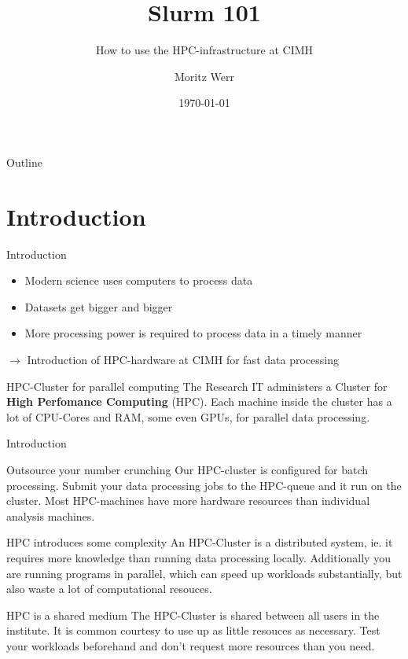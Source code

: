 \documentclass{beamer}
\title{Slurm 101}
\subtitle{How to use the HPC-infrastructure at CIMH}
\author{Moritz Werr}
\institute{Research IT}
\date{\today}
\begin{document}
\begin{frame}
    \titlepage
\end{frame}

\begin{frame}{Outline}
    \tableofcontents
\end{frame}

\section{Introduction}
\begin{frame}{Introduction}
	\begin{itemize}
		\item Modern science uses computers to process data
		\item Datasets get bigger and bigger
		\item More processing power is required to process data in a timely manner
	\end{itemize}
	
	\(\to\) Introduction of HPC-hardware at CIMH for fast data processing
	
	\begin{block}{HPC-Cluster for parallel computing}
		The Research IT administers a Cluster for \textbf{High Perfomance Computing} (HPC). Each machine inside the cluster has a lot of CPU-Cores and RAM, some even GPUs, for parallel data processing. 
	\end{block}
\end{frame}
\begin{frame}{Introduction}
	\begin{block}{Outsource your number crunching}
		Our HPC-cluster is configured for batch processing. Submit your data processing jobs to the HPC-queue and it run on the cluster. Most HPC-machines have more hardware resources than individual analysis machines.
	\end{block}
	\begin{block}{HPC introduces some complexity}
		An HPC-Cluster is a distributed system, ie. it requires more knowledge than running data processing locally. Additionally you are running programs in parallel, which can speed up workloads substantially, but also waste a lot of computational resouces.
	\end{block}
	\begin{block}{HPC is a shared medium}
		The HPC-Cluster is shared between all users in the institute. It is common courtesy to use up as little resouces as necessary. Test your workloads beforehand and don't request more resources than you need. 
	\end{block}
\end{frame}
\end{document}
